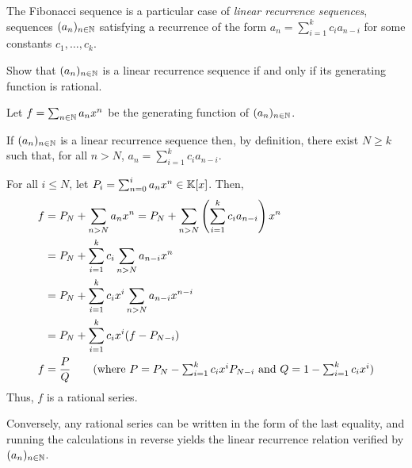 The Fibonacci sequence is a particular case of \emph{linear
recurrence sequences}, \ie sequences $(a_n)_{n \in \mathbb N}$ satisfying
a recurrence of the form $a_n = \sum_{i=1}^k c_i a_{n-i}$ for
some constants $c_1,\dots,c_k$.
\begin{exercise}\label{ex:lrs}
    Show that $(a_n)_{n \in \mathbb N}$ is a linear recurrence
    sequence if and only if its generating function is rational.
\end{exercise}
\begin{solution}
    Let $f = \sum_{n \in \mathbb N} a_n x^n$ be the generating function of
    $(a_n)_{n \in \mathbb N}$.

    If $(a_n)_{n \in \mathbb N}$ is a linear recurrence sequence then, by
    definition, there exist $N \geq k$ such that, for all $n>N$,
    $a_n = \sum_{i=1}^k c_i a_{n-i}$.

    For all $i \leq N$, let $P_i = \sum_{n=0}^i a_n x^n \in \mathbb K[x]$.
    Then,
    \begin{align*}
        f &= P_N+ \sum_{n>N} a_n x^n
        = P_N+ \sum_{n>N} \left(\sum_{i=1}^k c_i a_{n-i}\right) x^n \\
        &= P_N+ \sum_{i=1}^k c_i \sum_{n>N} a_{n-i} x^n \\
        &= P_N+ \sum_{i=1}^k c_i x^i \sum_{n>N} a_{n-i} x^{n-i} \\
        &= P_N+ \sum_{i=1}^k c_i x^i (f-P_{N-i}) \\
        f &= \frac{P}{Q} \tag{where $P=P_N- \sum_{i=1}^k c_i x^i
        P_{N-i}$ and $Q=1-\sum_{i=1}^k c_i x^i$}
    \end{align*}
    Thus, $f$ is a rational series.

    Conversely, any rational series can be written in the form of the
    last equality, and running the calculations in reverse yields the
    linear recurrence relation verified by $(a_n)_{n \in \mathbb N}$.
\end{solution}

